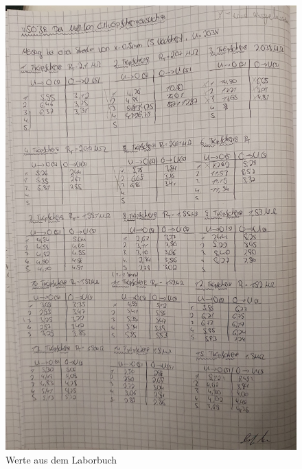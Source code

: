 \begin{figure}
    \includegraphics[width=14cm]{Laborbuch.jpg}
    \caption{Werte aus dem Laborbuch}
\end{figure}















